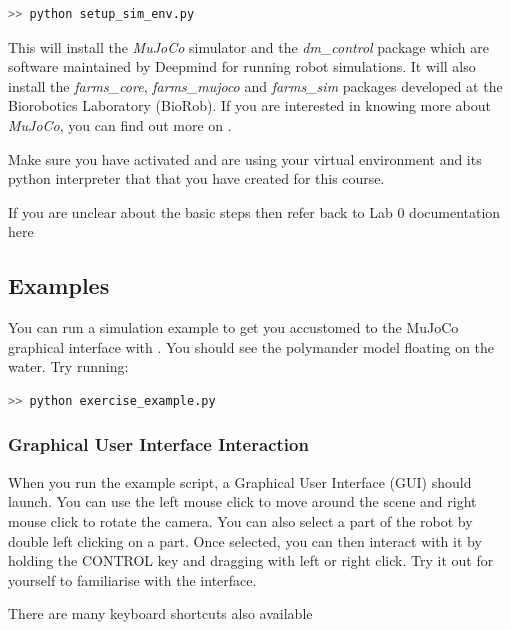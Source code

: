 \documentclass{cmc}
\begin{document}
\label{sec:mujoco-inst}
\begin{lstlisting}[language=Bash]
  >> python setup_sim_env.py
\end{lstlisting}

This will install the \textit{MuJoCo} simulator and the \textit{dm\_control}
package which are software maintained by Deepmind for running robot
simulations. It will also install the \textit{farms\_core},
\textit{farms\_mujoco} and \textit{farms\_sim} packages developed at the
Biorobotics Laboratory (BioRob). If you are interested in knowing more about
\textit{MuJoCo}, you can find out more on \href{https://mujoco.org/}{}.

 Make sure you have activated and are using your
virtual environment and its python interpreter that that you have created for
this course.

 If you are unclear about the basic steps then refer back
to Lab 0 documentation here
\href{https://farmsim.gitlab.io/courses/cmc-2023/}{}


\subsection*{Examples}
You can run a simulation example to get you accustomed
to the MuJoCo graphical interface with . You
should see the polymander model floating on the water. Try running:
\label{sec:mujoco-example}
\begin{lstlisting}[language=Bash]
  >> python exercise_example.py
\end{lstlisting}

\subsubsection*{Graphical User Interface Interaction}
When you run the example script, a Graphical User Interface (GUI) should launch.
You can use the left mouse click to move around the scene and right mouse click
to rotate the camera. You can also select a part of the robot by double left
clicking on a part. Once selected, you can then interact with it by holding the
CONTROL key and dragging with left or right click. Try it out for yourself to
familiarise with the interface.

There are many keyboard shortcuts also available
\end{document}
